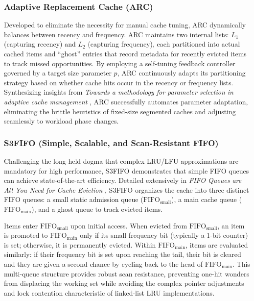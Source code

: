 \subsubsection{Adaptive Replacement Cache (ARC)}
Developed to eliminate the necessity for manual cache tuning, ARC dynamically balances between recency and frequency. ARC maintains two internal lists: $L_1$ (capturing recency) and $L_2$ (capturing frequency), each partitioned into actual cached items and ``ghost'' entries that record metadata for recently evicted items to track missed opportunities. By employing a self-tuning feedback controller governed by a target size parameter $p$, ARC continuously adapts its partitioning strategy based on whether cache hits occur in the recency or frequency lists. Synthesizing insights from \textit{Towards a methodology for parameter selection in adaptive cache management} \cite{vysotska_towards_2025}, ARC successfully automates parameter adaptation, eliminating the brittle heuristics of fixed-size segmented caches and adjusting seamlessly to workload phase changes.

\subsubsection{S3FIFO (Simple, Scalable, and Scan-Resistant FIFO)}
Challenging the long-held dogma that complex LRU/LFU approximations are mandatory for high performance, S3FIFO demonstrates that simple FIFO queues can achieve state-of-the-art efficiency. Detailed extensively in \textit{FIFO Queues are All You Need for Cache Eviction} \cite{yang_fifo_2023}, S3FIFO organizes the cache into three distinct FIFO queues: a small static admission queue ($\text{FIFO}_{\text{small}}$), a main cache queue ($\text{FIFO}_{\text{main}}$), and a ghost queue to track evicted items.

Items enter $\text{FIFO}_{\text{small}}$ upon initial access. When evicted from $\text{FIFO}_{\text{small}}$, an item is promoted to $\text{FIFO}_{\text{main}}$ only if its small frequency bit (typically a 1-bit counter) is set; otherwise, it is permanently evicted. Within $\text{FIFO}_{\text{main}}$, items are evaluated similarly: if their frequency bit is set upon reaching the tail, their bit is cleared and they are given a second chance by cycling back to the head of $\text{FIFO}_{\text{main}}$. This multi-queue structure provides robust scan resistance, preventing one-hit wonders from displacing the working set while avoiding the complex pointer adjustments and lock contention characteristic of linked-list LRU implementations.

